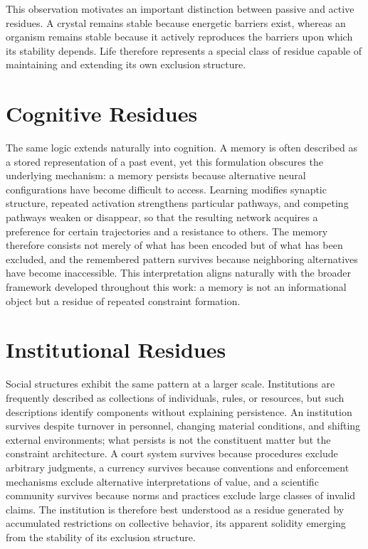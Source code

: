 \documentclass[11pt,oneside]{book}
\theoremstyle{plain}
\theoremstyle{definition}
\theoremstyle{remark}
\begin{document}
This observation motivates an important distinction between passive and active residues. A crystal remains stable because energetic barriers exist, whereas an organism remains stable because it actively reproduces the barriers upon which its stability depends. Life therefore represents a special class of residue capable of maintaining and extending its own exclusion structure.

\section{Cognitive Residues}

The same logic extends naturally into cognition. A memory is often described as a stored representation of a past event, yet this formulation obscures the underlying mechanism: a memory persists because alternative neural configurations have become difficult to access. Learning modifies synaptic structure, repeated activation strengthens particular pathways, and competing pathways weaken or disappear, so that the resulting network acquires a preference for certain trajectories and a resistance to others. The memory therefore consists not merely of what has been encoded but of what has been excluded, and the remembered pattern survives because neighboring alternatives have become inaccessible. This interpretation aligns naturally with the broader framework developed throughout this work: a memory is not an informational object but a residue of repeated constraint formation.

\section{Institutional Residues}

Social structures exhibit the same pattern at a larger scale. Institutions are frequently described as collections of individuals, rules, or resources, but such descriptions identify components without explaining persistence. An institution survives despite turnover in personnel, changing material conditions, and shifting external environments; what persists is not the constituent matter but the constraint architecture. A court system survives because procedures exclude arbitrary judgments, a currency survives because conventions and enforcement mechanisms exclude alternative interpretations of value, and a scientific community survives because norms and practices exclude large classes of invalid claims. The institution is therefore best understood as a residue generated by accumulated restrictions on collective behavior, its apparent solidity emerging from the stability of its exclusion structure.
\end{document}
